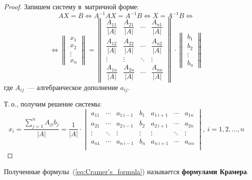 \begin{proof}
Запишем систему в~матричной форме:
\begin{equation*}
AX = B \Leftrightarrow
A^{-1}AX = A^{-1}B \Leftrightarrow
X = A^{-1}B \Leftrightarrow
\end{equation*}
\begin{equation*}
\Leftrightarrow
\begin{Vmatrix}
x_1 \\
x_2 \\
\vdots \\
x_n
\end{Vmatrix} =
\begin{Vmatrix}
\dfrac{A_{11}}{|A|} & \dfrac{A_{21}}{|A|} & \cdots & \dfrac{A_{n1}}{|A|} \\
\dfrac{A_{12}}{|A|} & \dfrac{A_{22}}{|A|} & \cdots & \dfrac{A_{n2}}{|A|} \\
\vdots & \vdots & \ddots & \vdots \\
\dfrac{A_{1n}}{|A|} & \dfrac{A_{2n}}{|A|} & \cdots & \dfrac{A_{nn}}{|A|}
\end{Vmatrix} \cdot
\begin{Vmatrix}
b_1 \\
b_2 \\
\vdots \\
b_n
\end{Vmatrix}
\end{equation*}
где $A_{ij}$~--- алгебраическое дополнение $a_{ij}$.

Т.\,о., получим решение системы:
\begin{equation}
\label{eq:Cramer's_formula}
x_i = \frac{\displaystyle \sum_{j=1}^n A_{ji} b_j}{|A|} =
\frac1{{|A|}} \cdot
\begin{vmatrix}
a_{11} & \cdots & a_{1\, i-1} & b_{1} & a_{1\, i+1} & \cdots & a_{1n} \\
a_{21} & \cdots & a_{2\, i-1} & b_{2} & a_{2\, i+1} & \cdots & a_{2n} \\
\vdots & \ddots & \vdots & \vdots & \vdots & \ddots & \vdots \\
a_{n1} & \cdots & a_{n\, i-1} & b_{n} & a_{n\, i+1} & \cdots & a_{nn} \\
\end{vmatrix}, \ i = 1, 2, \ldots, n
\end{equation}
\end{proof}

Полученные формулы~(\ref*{eq:Cramer's_formula}) называется \textbf{формулами Крамера}.